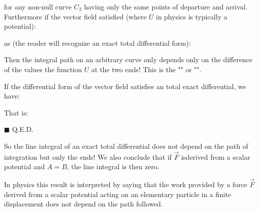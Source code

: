 	for any non-null curve $C_2$ having only the same points of departure and arrival. Furthermore if the vector field satisfied (where $U$ in physics is typically a potential):
	
	as (the reader will recognize an exact total differential form):
	
	Then the integral path on an arbitrary curve only depends only on the difference of the values the function $U$ at the two ends! This is the "" or "".
	\begin{dem}
	If the differential form of the vector field satisfies an total exact differential, we have:
	
	That is:
	
	\begin{flushright}
		$\blacksquare$  Q.E.D.
	\end{flushright}
	\end{dem}
	So the line integral of an exact total differential does not depend on the path of integration but only the ends! We also conclude that if $\vec{F}$ isderived from a scalar potential and $A = B$, the line integral is then zero.
	
	In physics this result is interpreted by saying that the work provided by a force $\vec{F}$ derived from a scalar potential acting on an elementary particle in a finite displacement does not depend on the path followed.
	

